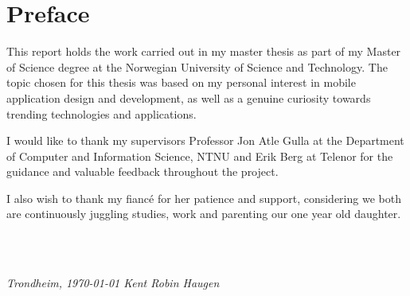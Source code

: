 \chapter*{Preface}

This report holds the work carried out in my master thesis as part of my Master of Science degree at the Norwegian University of Science and Technology. The topic chosen for this thesis was based on my personal interest in mobile application design and development, as well as a genuine curiosity towards trending technologies and applications.

I would like to thank my supervisors Professor Jon Atle Gulla at the Department of Computer and Information Science, NTNU and Erik Berg at Telenor for the guidance and valuable feedback throughout the project.

I also wish to thank my fiancé for her patience and support, considering we both are continuously juggling studies, work and parenting our one year old daughter.


\ \\ \\
\begin{center}
\emph{Trondheim, \today \hspace{30mm} Kent Robin Haugen}
\end{center}
\clearpage
